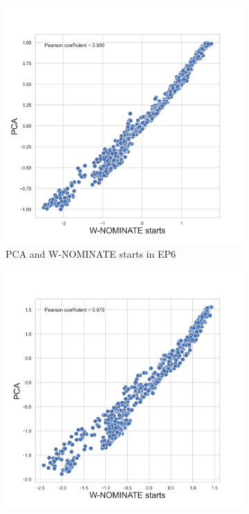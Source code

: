 \documentclass[a4paper,12pt]{report}
\begin{document}
                \begin{figure}[H]
                    \centering
                    \begin{subfigure}[b]{0.48\textwidth}
                        \centering
                        \includegraphics[width=\textwidth]{Graphs/Scatterstartspca6}
                        \caption{PCA and W-NOMINATE starts in EP6}
                        \label{fig:pca_SCATTER_6}
                    \end{subfigure}
                    \hfill
                    \begin{subfigure}[b]{0.48\textwidth}
                        \centering
                        \includegraphics[width=\textwidth]{Graphs/Scatterstartspca7}

\end{subfigure}
\end{figure}
\end{document}
